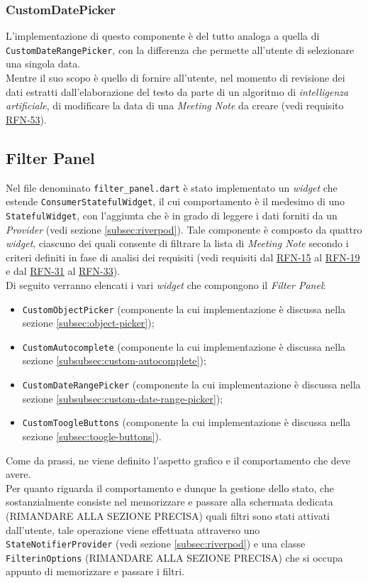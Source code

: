 \subsubsection*{CustomDatePicker}
\label{subsubsec:custom-date-picker}

L'implementazione di questo componente è del tutto analoga a quella di \lstinline{CustomDateRangePicker}, con la differenza che permette all'utente di selezionare una singola data.\\
Mentre il suo scopo è quello di fornire all'utente, nel momento di revisione dei dati estratti dall'elaborazione del testo da parte di un algoritmo di \emph{intelligenza artificiale}, di modificare la data di una \emph{Meeting Note} da creare (vedi requisito \hyperref[RFN-53]{RFN-53}).

\subsection{Filter Panel}
\label{subsec:filter-panel}

Nel file denominato \lstinline{filter_panel.dart} è stato implementato un \emph{widget} che estende \lstinline{ConsumerStatefulWidget}\cite{site:reading-provider}, il cui comportamento è il medesimo di uno \lstinline{StatefulWidget}, con l'aggiunta che è in grado di leggere i dati forniti da un \emph{Provider} (vedi sezione \ref{subsec:riverpod}).
Tale componente è composto da quattro \emph{widget}, ciascuno dei quali consente di filtrare la lista di \emph{Meeting Note}  secondo i criteri definiti in fase di analisi dei requisiti (vedi requisiti dal \hyperref[RFN-15]{RFN-15} al \hyperref[RFN-19]{RFN-19} e dal \hyperref[RFN-31]{RFN-31} al \hyperref[RFN-33]{RFN-33}). \\
Di seguito verranno elencati i vari \emph{widget} che compongono il \emph{Filter Panel}: 
\begin{itemize}
    \item \lstinline{CustomObjectPicker} (componente la cui implementazione è discussa nella sezione \ref{subsec:object-picker});
    \item \lstinline{CustomAutocomplete} (componente la cui implementazione è discussa nella sezione \ref{subsubsec:custom-autocomplete});
    \item \lstinline{CustomDateRangePicker} (componente la cui implementazione è discussa nella sezione \ref{subsubsec:custom-date-range-picker});
    \item \lstinline{CustomToogleButtons} (componente la cui implementazione è discussa nella sezione \ref{subsec:toogle-buttons}).
\end{itemize}
Come da prassi, ne viene definito l'aspetto grafico e il comportamento che deve avere.\\
Per quanto riguarda il comportamento e dunque la gestione dello stato, che sostanzialmente consiste nel memorizzare e passare alla schermata dedicata (RIMANDARE ALLA SEZIONE PRECISA) quali filtri sono stati attivati dall'utente, tale operazione viene effettuata attraverso uno \lstinline{StateNotifierProvider} (vedi sezione \ref{subsec:riverpod}) e una classe \lstinline{FilterinOptions} (RIMANDARE ALLA SEZIONE PRECISA) che si occupa appunto di memorizzare e passare i filtri.\\


